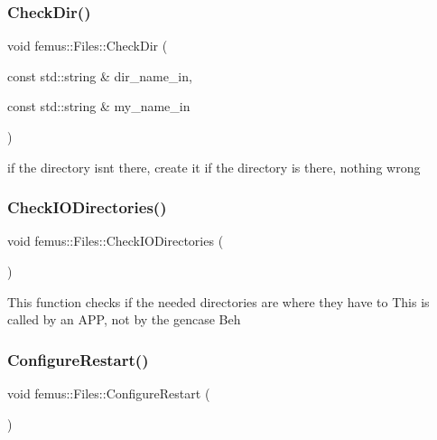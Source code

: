 \subsubsection{\texorpdfstring{Check\+Dir()}{CheckDir()}}
{\footnotesize\ttfamily void femus\+::\+Files\+::\+Check\+Dir (\begin{DoxyParamCaption}\item[{const std\+::string \&}]{dir\+\_\+name\+\_\+in,  }\item[{const std\+::string \&}]{my\+\_\+name\+\_\+in }\end{DoxyParamCaption})\hspace{0.3cm}{\ttfamily [static]}}

if the directory isnt there, create it if the directory is there, nothing wrong \mbox{\label{classfemus_1_1_files_a5f6d341bd11bf8f56891f79607f8c395}} 
\subsubsection{\texorpdfstring{Check\+I\+O\+Directories()}{CheckIODirectories()}}
{\footnotesize\ttfamily void femus\+::\+Files\+::\+Check\+I\+O\+Directories (\begin{DoxyParamCaption}{ }\end{DoxyParamCaption})}

This function checks if the needed directories are where they have to This is called by an A\+PP, not by the gencase Beh \mbox{\label{classfemus_1_1_files_a38c38ec2557fb275bf3c301f93e9e958}} 
\subsubsection{\texorpdfstring{Configure\+Restart()}{ConfigureRestart()}}
{\footnotesize\ttfamily void femus\+::\+Files\+::\+Configure\+Restart (\begin{DoxyParamCaption}{ }\end{DoxyParamCaption})}

\mbox{\label{classfemus_1_1_files_a513b4baed4cd225643cdaa2c5884de0f}} 
